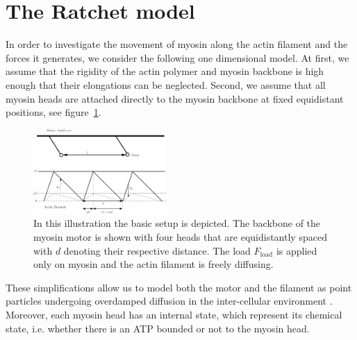 \documentclass[aps,pre,twocolumn,showpacs,showkeys,superscriptaddress,floatfix]{revtex4-1}
\begin{document}
\section{The Ratchet model}
\label{sec:ratchet}
In order to investigate the movement of myosin along the actin filament and the forces it generates, we consider the following one dimensional model.
At first, we assume that the rigidity of the actin polymer and myosin backbone is high enough that their elongations can be neglected.
Second, we assume that all myosin heads are attached directly to the myosin backbone at fixed equidistant positions, see figure~\ref{fig:ratchet_setup}.
\begin{figure}[t]
\centering
\includegraphics[width=0.45\textwidth,height=!]{ratchet_illustration}
\caption{
\label{fig:ratchet_setup}
In this illustration the basic setup is depicted.  
The backbone of the myosin motor is shown with four heads that are equidistantly spaced with $d$ denoting their respective distance. 
The load $F_\text{load}$ is applied only on myosin and the actin filament is freely diffusing. 
} 
\end{figure}
These simplifications allow us to model both the motor and the filament as point particles undergoing overdamped diffusion in the inter-cellular environment \cite{vanKampen1981stochastic}.
Moreover, each myosin head has an internal state, which represent its chemical state, 
i.e. whether there is an ATP bounded or not to the myosin head. 
\end{document}
